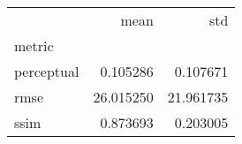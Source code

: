 \begin{tabular}{lrr}
\toprule
{} &       mean &        std \\
metric     &            &            \\
\midrule
perceptual &   0.105286 &   0.107671 \\
rmse       &  26.015250 &  21.961735 \\
ssim       &   0.873693 &   0.203005 \\
\bottomrule
\end{tabular}

